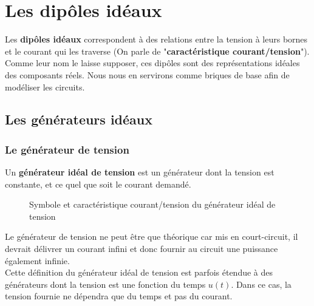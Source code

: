 \chapter{ Les dipôles idéaux }

Les \textbf{dipôles idéaux} correspondent à des relations entre la tension à leurs bornes et le courant qui les traverse (On parle de "\textbf{caractéristique courant/tension}"). Comme leur nom le laisse supposer, ces dipôles sont des représentations idéales des composants réels. Nous nous en servirons comme briques de base afin de modéliser les circuits. 

\section{Les générateurs idéaux}

\subsection{ Le générateur de tension }

Un \textbf{générateur idéal de tension} est un générateur dont la tension est constante, et ce quel que soit le courant demandé.

\begin{figure}[!h]
\begin{center}

\hspace{1cm}

\end{center}
\caption{ Symbole et caractéristique courant/tension du générateur idéal de tension}
\end{figure}

Le générateur de tension ne peut être que théorique car mis en court-circuit, il devrait délivrer un courant infini et donc fournir au circuit une puissance également infinie.\\

Cette définition du générateur idéal de tension est parfois étendue à des générateurs dont la tension est une fonction du temps $u(t)$. Dans ce cas, la tension fournie ne dépendra que du temps et pas du courant. 

